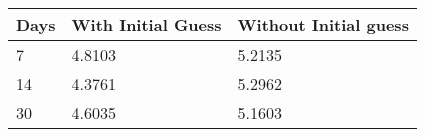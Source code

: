 \begin{tabular}{lll}
Days & With Initial Guess & Without Initial guess \\ 
\hline 
7 & 4.8103 & 5.2135 \\ 
14 & 4.3761 & 5.2962 \\ 
30 & 4.6035 & 5.1603 \\ 
\hline 
\end{tabular}